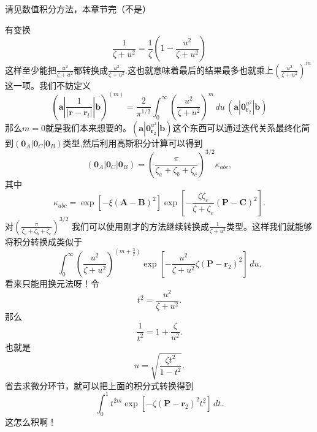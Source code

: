 \documentclass[12pt,a4paper,openany,twoside]{book}
\numberwithin{equation}{section}
\begin{document}
          请见数值积分方法，本章节完（不是）

          有变换
          \begin{equation}
              \frac{1}{\zeta + u^2} = \frac{1}{\zeta} \left(1 - \frac{u^2}{\zeta + u^2}\right)
          \end{equation}
          这样至少能把$\frac{u^2}{\zeta+u^2}$都转换成$\frac{u^2}{\zeta+u^2}$.这也就意味着最后的结果最多也就乘上$(\frac{u^2}{\zeta+u^2})^m$这一项。我们不妨定义
          \begin{equation}
              (\boldsymbol{a} | \frac{1}{|\boldsymbol{r} - \boldsymbol{r}_l|} |\boldsymbol{b} )^{(m)} = \frac{2}{\pi^{1 / 2}} \int_0^\infty \left(\frac{u^2}{\zeta+u^2}\right)^m\, du \, (\boldsymbol{a}|\boldsymbol{0}_{\boldsymbol{r}_2}^{u^2}|\boldsymbol{b})
          \end{equation}
          那么$m=0$就是我们本来想要的。$(\boldsymbol{a}|\boldsymbol{0}_{\boldsymbol{r}_2}^{u^2}|\boldsymbol{b})$这个东西可以通过迭代关系最终化简到$(\boldsymbol{0}_A|\boldsymbol{0}_C|\boldsymbol{0}_B)$类型,然后利用高斯积分计算可以得到
          \begin{equation}
              \left(\boldsymbol{0}_{A}\left|\boldsymbol{0}_{C}\right| \boldsymbol{0}_{B}\right)=\left(\frac{\pi}{\zeta_{a}+\zeta_{b}+\zeta_{c}}\right)^{3 / 2} \kappa_{a b c},
          \end{equation}
          其中
          \begin{equation}
              \kappa_{a b c}=\exp \left[-\xi(\boldsymbol{A}-\boldsymbol{B})^{2}\right] \exp \left[-\frac{\zeta \zeta_{c}}{\zeta+\zeta_{c}}(\boldsymbol{P}-\boldsymbol{C})^{2}\right].
          \end{equation}
          对$\left(\frac{\pi}{\zeta_{a}+\zeta_{b}+\zeta_{c}}\right)^{3 / 2}$ 我们可以使用刚才的方法继续转换成$\frac{1}{\zeta + u^2}$类型。这样我们就能够将积分转换成类似于
          \[
              \int_0^\infty \left(\frac{u^2}{\zeta + u^2}\right)^{(m+\frac{3}{2})}\exp\left[-\frac{u^2}{\zeta + u^2} \zeta (\boldsymbol{P}-\boldsymbol{r}_2)^2\right]\, du.
          \]
          看来只能用换元法呀！令
          \begin{equation}
              t^2 = \frac{u^2}{\zeta + u^2}.
          \end{equation}
          那么
          \begin{equation}
              \frac{1}{t^2} = 1 + \frac{\zeta}{u^2}.
          \end{equation}
          也就是
          \begin{equation}
              u = \sqrt{\frac{\zeta t^2}{1-t^2}}.
          \end{equation}
          省去求微分环节，就可以把上面的积分式转换得到
          \[
              \int_0^1 t^{2m} \exp\left[-\zeta (\boldsymbol{P}-\boldsymbol{r}_2)^2t^2\right]\, dt.
          \]
          这怎么积啊！
\end{document}
